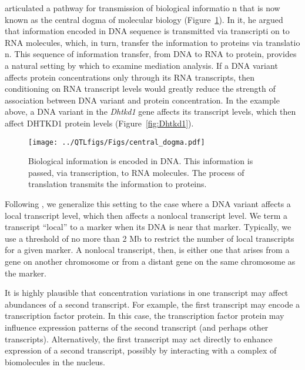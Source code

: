 \documentclass[oneside]{book}
\begin{document}
\citet{crick1958protein} articulated a pathway for transmission of biological informatio
n that is now known as the central dogma of molecular biology (Figure~\ref{fig:dogma}). 
In it, he argued that information encoded in DNA sequence is transmitted via transcripti
on to RNA molecules, which, in turn, transfer the information to proteins via translatio
n. This sequence of information transfer, from DNA to RNA to protein, provides a natural 
setting by which to examine mediation analysis. If a DNA variant affects protein 
concentrations only through its RNA transcripts, then conditioning on RNA transcript 
levels would greatly reduce the strength of association between DNA variant and protein 
concentration. In the example above, a DNA variant in the \emph{Dhtkd1} gene affects its 
transcript levels, which then affect DHTKD1 protein levels (Figure~\ref{fig:Dhtkd1}).




\begin{figure}
  \centering
  \texttt{[image: ../QTLfigs/Figs/central\_dogma.pdf]}
  \caption{Biological information is encoded in DNA. This information is passed, via transcription, to RNA molecules. The process of translation transmits the information to proteins.}\label{fig:dogma}
\end{figure}





Following \citet{keller2018genetic}, we generalize this setting to the case where a DNA variant affects a local transcript level, which then affects a nonlocal transcript level. We term a transcript ``local'' to a marker when its DNA is near that marker. Typically, we use a threshold of no more than 2 Mb to restrict the number of local transcripts for a given marker. A nonlocal transcript, then, is either one that arises from a gene on another chromosome or from a distant gene on the same chromosome as the marker.

It is highly plausible that concentration variations in one transcript may affect abundances of a second transcript. For example, the first transcript may encode a transcription factor protein. In this case, the transcription factor protein may influence expression patterns of the second transcript (and perhaps other transcripts). Alternatively, the first transcript may act directly to enhance expression of a second transcript, possibly by interacting with a complex of biomolecules in the nucleus.
\end{document}
